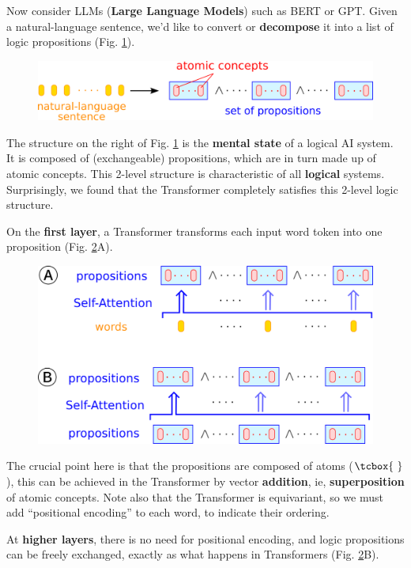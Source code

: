 \documentclass[runningheads]{llncs}
\newcommand{\circled}[1]{{\textcircled{\sffamily \scriptsize{#1}}}}
\newcommand{\atom}{\vcenter{\hbox{\tcbox{\mbox{     }}}}}
\begin{document}
Now consider LLMs (\textbf{Large Language Models}) such as BERT or GPT.  Given a natural-language sentence, we'd like to convert or \textbf{decompose} it into a list of logic propositions (Fig. \ref{Transformer-layer1}).
\begin{figure}[h]
	\centering
	\includegraphics[scale=0.6]{Transformer-layer1.png}
	\caption{}
	\label{Transformer-layer1}
\end{figure}
The structure on the right of Fig. \ref{Transformer-layer1} is the \textbf{mental state} of a logical AI system.  It is composed of (exchangeable) propositions, which are in turn made up of atomic concepts.  This 2-level structure is characteristic of all \textbf{logical} systems.  Surprisingly, we found that the Transformer completely satisfies this 2-level logic structure.

On the \textbf{first layer}, a Transformer transforms each input word token into one proposition (Fig. \ref{Transformer-layers}\circled{A}).
\begin{figure}
	\centering
	\includegraphics[scale=0.6]{Transformer-layers.png}
	\caption{}
	\label{Transformer-layers}
\end{figure}
The crucial point here is that the propositions are composed of atoms ($\atom$), this can be achieved in the Transformer by vector \textbf{addition}, ie, \textbf{superposition} of atomic concepts.  Note also that the Transformer is equivariant, so we must add ``positional encoding'' to each word, to indicate their ordering.

At \textbf{higher layers}, there is no need for positional encoding, and logic propositions can be freely exchanged, exactly as what happens in Transformers (Fig. \ref{Transformer-layers}\circled{B}).
\end{document}
